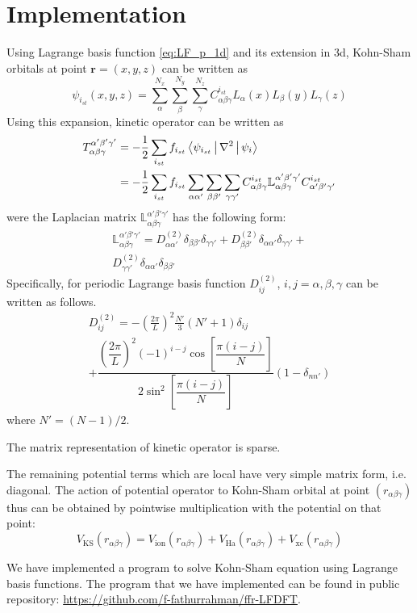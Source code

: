 \section{Implementation}

Using Lagrange basis function \ref{eq:LF_p_1d} and its extension in 3d, Kohn-Sham orbitals
at point $\mathbf{r} = (x,y,z)$ can be written as
\begin{equation}
\psi_{i_{st}}(x,y,z) = \sum_{\alpha}^{N_x} \sum_{\beta}^{N_y} \sum_{\gamma}^{N_z}
C_{\alpha\beta\gamma}^{i_{st}} L_{\alpha}(x) L_{\beta}(y) L_{\gamma}(z)
\end{equation}
%
Using this expansion, kinetic operator can be written as
\begin{align}
T_{\alpha\beta\gamma}^{\alpha'\beta'\gamma'} & = -\frac{1}{2} \sum_{i_{st}} f_{i_{st}}
\Braket{ \psi_{i_{st}} | \nabla^2 | \psi_{i} } \\
& =
-\frac{1}{2}
\sum_{i_{st}} f_{i_{st}} \sum_{\alpha\alpha'} \sum_{\beta\beta'} \sum_{\gamma\gamma'}
C^{i_{st}}_{\alpha\beta\gamma} \mathbb{L}_{\alpha\beta\gamma}^{\alpha'\beta'\gamma'}
C^{i_{st}}_{\alpha'\beta'\gamma'}
\end{align}
%
were the Laplacian matrix $\mathbb{L}_{\alpha\beta\gamma}^{\alpha'\beta'\gamma'}$
has the following form:
\begin{multline}
\mathbb{L}_{\alpha\beta\gamma}^{\alpha'\beta'\gamma'} =
D^{(2)}_{\alpha\alpha'}\delta_{\beta\beta'}\delta_{\gamma\gamma'} +
D^{(2)}_{\beta\beta'}\delta_{\alpha\alpha'}\delta_{\gamma\gamma'} + \\
D^{(2)}_{\gamma\gamma'}\delta_{\alpha\alpha'}\delta_{\beta\beta'}
\end{multline}
%
Specifically, for periodic Lagrange basis function $D^{(2)}_{ij}$, $i, j = \alpha, \beta, \gamma$
can be written as follows.
\begin{multline}
D^{(2)}_{ij} = -\left( \frac{2\pi}{L} \right)^2 \frac{N'}{3} \left( N' + 1 \right) \delta_{ij} \\
+ \dfrac{ \left(\dfrac{2\pi}{L}\right)^2 (-1)^{i-j}\cos\left[\dfrac{\pi(i-j)}{N}\right]}
{2\sin^2\left[\dfrac{\pi(i-j)}{N}\right]}
(1-\delta_{nn'})
\label{eq:kin1d_p}
\end{multline}
where $N' = (N-1)/2$.

The matrix representation of kinetic operator is sparse.

The remaining potential terms which are local have very simple matrix form, i.e.
diagonal. The action of potential operator to Kohn-Sham orbital at point
$(r_{\alpha\beta\gamma})$ thus can be
obtained by pointwise multiplication with the potential on that point:
\begin{equation}
V_{\mathrm{KS}}(r_{\alpha\beta\gamma}) = V_{\mathrm{ion}}(r_{\alpha\beta\gamma}) +
V_{\mathrm{Ha}}(r_{\alpha\beta\gamma}) + V_{\mathrm{xc}}(r_{\alpha\beta\gamma})
\end{equation}

We have implemented a program to solve Kohn-Sham equation using Lagrange basis functions.
The program that we have implemented can be found in public repository:
\url{https://github.com/f-fathurrahman/ffr-LFDFT}.